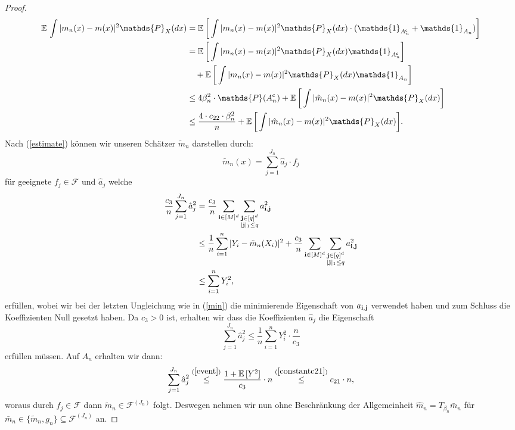 \begin{proof}
\begin{equation}
\label{originaleq}
\begin{split}
\E \int |m_n(x) - m(x)|^2 \mathds{P}_X(dx) & = \E \bigg[\int |m_n(x) - m(x)|^2 \mathds{P}_X(dx) \cdot (\mathds{1}_{A_n^{\mathsf{c}}} + \mathds{1}_{A_n})\bigg] \\
& = \E \bigg[\int |m_n(x) - m(x)|^2 \mathds{P}_X(dx) \mathds{1}_{A_n^{\mathsf{c}}}\bigg] \\
& \quad + \E \bigg[\int |m_n(x) - m(x)|^2 \mathds{P}_X(dx) \mathds{1}_{A_n}\bigg] \\
& \leq 4\beta_n^2 \cdot \mathds{P}(A_n^{\mathsf{c}}) + \E \bigg[\int |\hat{m}_n(x) - m(x)|^2 \mathds{P}_X(dx)\bigg] \\
& \leq \frac{4 \cdot c_{22} \cdot \beta_n^2}{n} + \E \bigg[\int |\hat{m}_n(x) - m(x)|^2 \mathds{P}_X(dx)\bigg].
\end{split}
\end{equation}
Nach (\ref{estimate}) können wir unseren Schätzer $\tilde{m}_n$ darstellen durch:
$$\tilde{m}_n(x) = \sum_{j = 1}^{J_n}\hat{a}_j \cdot f_j$$
für geeignete $f_j \in \mathcal{F}$ und $\hat{a}_j$ welche 
\begin{equation*}
\begin{split}
\frac{c_3}{n}\sum_{j = 1}^{J_n} \hat{a}_j^2 & = \frac{c_3}{n} \sum_{\mathbf{i} \in [M]^d} \sum_{\substack{\mathbf{j} \in [q]^d \\ |\mathbf{j}|_1 \leq q}} a_{\mathbf{i},\mathbf{j}}^2 \\
& \leq \frac{1}{n} \sum_{i = 1}^n|Y_i - \tilde{m}_n(X_i)|^2 + \frac{c_3}{n} \sum_{\mathbf{i} \in [M]^d} \sum_{\substack{\mathbf{j} \in [q]^d \\ |\mathbf{j}|_1 \leq q}} a_{\mathbf{i},\mathbf{j}}^2 \\
& \leq \sum_{i = 1}^n Y_i^2,
\end{split}
\end{equation*}
erfüllen, wobei wir bei der letzten Ungleichung wie in (\ref{min}) die minimierende Eigenschaft von $a_{\mathbf{i},\mathbf{j}}$ verwendet haben und zum Schluss die Koeffizienten Null gesetzt haben. Da $c_3 > 0$ ist, erhalten wir dass die Koeffizienten $\hat{a}_j$ die Eigenschaft
$$\sum_{j = 1}^{J_n} \hat{a}_j^2  \leq \frac{1}{n}\sum_{i = 1}^n Y_i^2 \cdot \frac{n}{c_3}$$
erfüllen müssen.
Auf $A_n$ erhalten wir dann:
$$\sum_{j = 1}^{J_n}\hat{a}_j^2 \stackrel{(\ref{event})}{\leq} \frac{1 + \mathbb{E}\,[Y^2]}{c_3} \cdot n \stackrel{(\ref{constantc21})}{\leq} c_{21} \cdot n,$$
woraus durch $f_j \in \mathcal{F}$ dann $\tilde{m}_n \in \mathcal{F}^{(J_n)}$ folgt.
Deswegen nehmen wir nun ohne Beschränkung der Allgemeinheit $\hat{m}_n = T_{\beta_n}\bar{m}_n$ für $\bar{m}_n \in \{\tilde{m}_n, g_n\} \subseteq \mathcal{F}^{(J_n)}$ an.

\end{proof}
